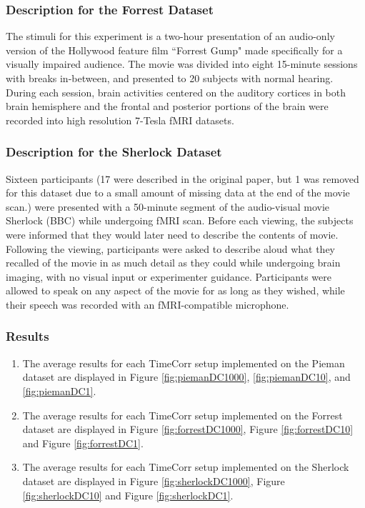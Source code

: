 \documentclass[11pt]{article}
\begin{document}
\subsubsection{Description for the Forrest Dataset}
The stimuli for this experiment is a two-hour presentation of an audio-only version of the Hollywood feature film ``Forrest Gump" made specifically for a visually impaired audience. The movie was divided into eight 15-minute sessions with breaks in-between, and presented to 20 subjects with normal hearing. During each session, brain activities centered on the auditory cortices in both brain hemisphere and the frontal and posterior portions of the brain were recorded into high resolution 7-Tesla fMRI datasets.\cite{Hanke2014}

\subsubsection{Description for the Sherlock Dataset}
Sixteen participants (17 were described in the original paper, but 1 was removed for this dataset due to a small amount of missing data at the end of the movie scan.) were presented with a 50-minute segment of the audio-visual movie Sherlock (BBC) while undergoing fMRI scan. Before each viewing, the subjects were informed that they would later need to describe the contents of movie. Following the viewing, participants were asked to describe aloud what they recalled of the movie in as much detail as they could while undergoing brain imaging, with no visual input or experimenter guidance. Participants were allowed to speak on any aspect of the movie for as long as they wished, while their speech was recorded with an fMRI-compatible microphone. \cite{Chen2017}

\subsubsection{Results}
\begin{enumerate}
\item The average results for each TimeCorr setup implemented on the Pieman dataset are displayed in Figure \ref{fig:piemanDC1000}, \ref{fig:piemanDC10}, and \ref{fig:piemanDC1}.
\item The average results for each TimeCorr setup implemented on the Forrest dataset are displayed in Figure \ref{fig:forrestDC1000}, Figure \ref{fig:forrestDC10} and Figure \ref{fig:forrestDC1}.
\item The average results for each TimeCorr setup implemented on the Sherlock dataset are displayed in Figure \ref{fig:sherlockDC1000}, Figure \ref{fig:sherlockDC10} and Figure \ref{fig:sherlockDC1}.
\end{enumerate}
\end{document}
